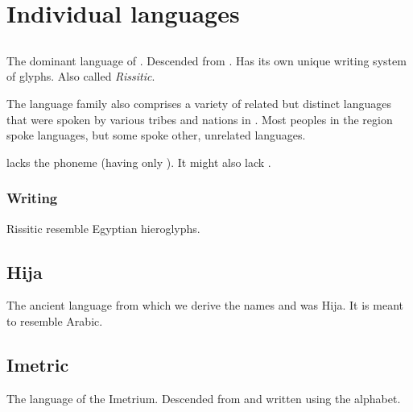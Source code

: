 \section{Individual languages}









\subsection{\Durcaci}
The dominant language of \Durcac. 
Descended from . 
Has its own unique writing system of glyphs. 
Also called \emph{Rissitic}. 

The \Durcaci language family also comprises a variety of related but distinct languages that were spoken by various tribes and nations in \Durcac. 
Most peoples in the region spoke \Durcaci languages, but some spoke other, unrelated languages. 

\Durcaci lacks the phoneme \txipa{[x]} (having only \txipa{[\c c]}). 
It might also lack \txipa{[l]}. 










\subsubsection{Writing}
Rissitic  resemble Egyptian hieroglyphs. 









\subsection{Hija}
The ancient \caisith language from which we derive the names  and  was Hija. It is meant to resemble Arabic. 








\subsection{Imetric}
The language of the Imetrium. 
Descended from \Ortaican and written using the \Ortaican alphabet. 

